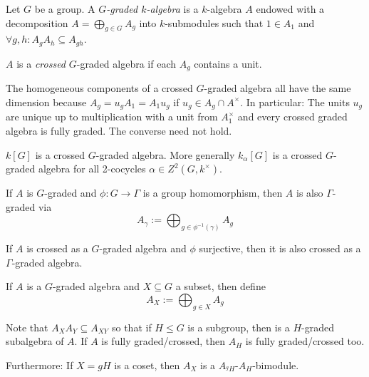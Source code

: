 
\begin{definition}
Let $G$ be a group. A \emph{$G$-graded $k$-algebra} is a $k$-algebra $A$ endowed with a decomposition $A=\bigoplus_{g\in G} A_g$ into $k$-submodules such that $1\in A_1$ and $\forall g,h: A_g A_h\subseteq A_{gh}$.

\medbreak
$A$ is a \emph{crossed} $G$-graded algebra if each $A_g$ contains a unit.
\end{definition}

\begin{remark}
The homogeneous components of a crossed $G$-graded algebra all have the same dimension because $A_g = u_g A_1 = A_1 u_g$ if $u_g\in A_g\cap A^\times$. In particular: The units $u_g$ are unique up to multiplication with a unit from $A_1^\times$ and every crossed graded algebra is fully graded. The converse need not hold.
\end{remark}

\begin{example}
$k[G]$ is a crossed $G$-graded algebra. More generally $k_\alpha[G]$ is a crossed $G$-graded algebra for all 2-cocycles $\alpha\in Z^2(G,k^\times)$.
\end{example}

\begin{example}
If $A$ is $G$-graded and $\phi:G\to\Gamma$ is a group homomorphism, then $A$ is also $\Gamma$-graded via
\[A_\gamma := \bigoplus_{g\in\phi^{-1}(\gamma)} A_g\]

If $A$ is crossed as a $G$-graded algebra and $\phi$ surjective, then it is also crossed as a $\Gamma$-graded algebra.
\end{example}

\begin{example}[Subgroups]
If $A$ is a $G$-graded algebra and $X\subseteq G$ a subset, then define
\[A_X := \bigoplus_{g\in X} A_g\]

Note that $A_X A_Y \subseteq A_{XY}$ so that if $H\leq G$ is a subgroup, then is a $H$-graded subalgebra of $A$. If $A$ is fully graded/crossed, then $A_H$ is fully graded/crossed too.

Furthermore: If $X=gH$ is a coset, then $A_X$ is a $A_{^g H}$-$A_H$-bimodule.
\end{example}

